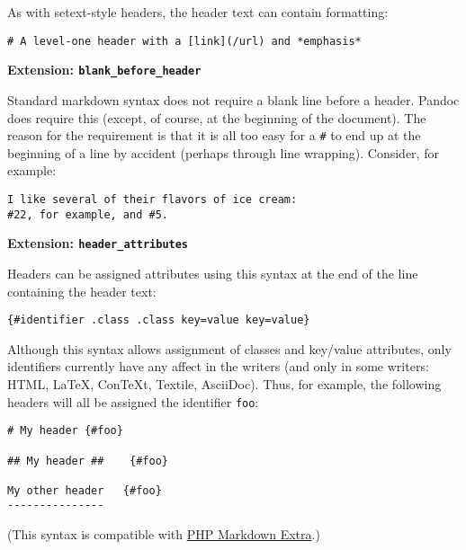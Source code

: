 \documentclass[]{article}
\begin{document}
As with setext-style headers, the header text can contain formatting:

\begin{verbatim}
# A level-one header with a [link](/url) and *emphasis*
\end{verbatim}

\textbf{Extension: \texttt{blank\_before\_header}}

Standard markdown syntax does not require a blank line before a header.
Pandoc does require this (except, of course, at the beginning of the
document). The reason for the requirement is that it is all too easy for
a \texttt{\#} to end up at the beginning of a line by accident (perhaps
through line wrapping). Consider, for example:

\begin{verbatim}
I like several of their flavors of ice cream:
#22, for example, and #5.
\end{verbatim}


\textbf{Extension: \texttt{header\_attributes}}

Headers can be assigned attributes using this syntax at the end of the
line containing the header text:

\begin{verbatim}
{#identifier .class .class key=value key=value}
\end{verbatim}

Although this syntax allows assignment of classes and key/value
attributes, only identifiers currently have any affect in the writers
(and only in some writers: HTML, LaTeX, ConTeXt, Textile, AsciiDoc).
Thus, for example, the following headers will all be assigned the
identifier \texttt{foo}:

\begin{verbatim}
# My header {#foo}

## My header ##    {#foo}

My other header   {#foo}
---------------
\end{verbatim}

(This syntax is compatible with
\href{http://www.michelf.com/projects/php-markdown/extra/}{PHP Markdown
Extra}.)
\end{document}
